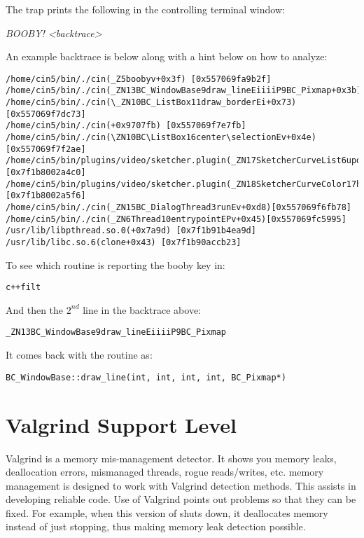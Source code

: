The trap prints the following in the controlling terminal window:

\hspace{2em} \textit{BOOBY! \qquad <backtrace>}

An example backtrace is below along with a hint below on how to analyze:

\begin{lstlisting}[numbers=none]
/home/cin5/bin/./cin(_Z5boobyv+0x3f) [0x557069fa9b2f] /home/cin5/bin/./cin(_ZN13BC_WindowBase9draw_lineEiiiiP9BC_Pixmap+0x3b)0x557069fb9a9b]
/home/cin5/bin/./cin(\_ZN10BC_ListBox11draw_borderEi+0x73)[0x557069f7dc73]
/home/cin5/bin/./cin(+0x9707fb) [0x557069f7e7fb]
/home/cin5/bin/./cin(\ZN10BC\ListBox16center\selectionEv+0x4e)[0x557069f7f2ae]
/home/cin5/bin/plugins/video/sketcher.plugin(_ZN17SketcherCurveList6updateEi+0x1a0)[0x7f1b8002a4c0]
/home/cin5/bin/plugins/video/sketcher.plugin(_ZN18SketcherCurveColor17handle_done_eventEi+0x76)[0x7f1b8002a5f6]
/home/cin5/bin/./cin(_ZN15BC_DialogThread3runEv+0xd8)[0x557069f6fb78]
/home/cin5/bin/./cin(_ZN6Thread10entrypointEPv+0x45)[0x557069fc5995]
/usr/lib/libpthread.so.0(+0x7a9d) [0x7f1b91b4ea9d]
/usr/lib/libc.so.6(clone+0x43) [0x7f1b90accb23]
\end{lstlisting}

To see which routine is reporting the booby key in:

\hspace{2em} \texttt{c++filt}

And then the $2^{nd}$ line in the backtrace above:

\hspace{2em}\texttt{\_ZN13BC\_WindowBase9draw\_lineEiiiiP9BC\_Pixmap}

It comes back with the routine as:

\hspace{2em}\texttt{BC\_WindowBase::draw\_line(int, int, int, int, BC\_Pixmap*)}

\section{Valgrind Support Level}
\label{sec:valgrind_support_level}

Valgrind is a memory mis-management detector.  It shows you memory leaks, deallocation errors, mismanaged threads, rogue reads/writes, etc.  \CGG{} memory management is designed to work with Valgrind detection methods.  This assists in developing reliable code.  Use of Valgrind points out problems so that they can be fixed.  For example, when this version of \CGG{} shuts down, it deallocates memory instead of just stopping, thus making memory leak detection possible.

